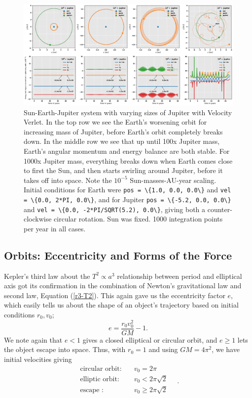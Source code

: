 \documentclass[]{article}
\begin{document}
\begin{figure}[!htb]
	\centering
	\includegraphics[width=1\linewidth]{massive-jupiter.png}
	\caption{Sun-Earth-Jupiter system with varying sizes of Jupiter with Velocity Verlet. In the top row we see the Earth's worsening orbit for increasing mass of Jupiter, before Earth's orbit completely breaks down. In the middle row we see that up until 100x Jupiter mass, Earth's angular momentum and energy balance are both stable. For 1000x Jupiter mass, everything breaks down when Earth comes close to first the Sun, and then starts swirling around Jupiter, before it takes off into space. Note the $10^{-5}$ Sun-masses-AU-year scaling. Initial conditions for Earth were \lstinline|pos = \{1.0, 0.0, 0.0\}| and \lstinline|vel = \{0.0, 2*PI, 0.0\}|, and for Jupiter \lstinline|pos = \{-5.2, 0.0, 0.0\}| and \lstinline|vel = \{0.0, -2*PI/SQRT(5.2), 0.0\}|, giving both a counter-clockwise circular rotation. Sun was fixed. 1000 integration points per year in all cases.}
	\label{fig:massive-jupiter}
\end{figure}

\subsection{Orbits: Eccentricity and Forms of the Force}
Kepler's third law about the $T^2 \propto a^3$ relationship between period and elliptical axis got its confirmation in the combination of Newton's gravitational law and second law, Equation (\ref{r3-T2}). This again gave us the eccentricity factor $e$, which easily tells us about the shape of an object's trajectory based on initial conditions $r_0, v_0$;
\begin{equation}
	e = \frac{r_0 v_0^2}{GM} - 1.
\end{equation}
We note again that $e<1$ gives a closed elliptical or circular orbit, and $e \ge 1$ lets the object escape into space. Thus, with $r_0 = 1$ and using $GM = 4 \pi^2$, we have initial velocities giving
\begin{equation} \label{v0}
\begin{aligned}
	\text{circular orbit:}& \quad v_0 = 2 \pi \\
	\text{elliptic orbit:}& \quad v_0 < 2 \pi \sqrt{2} \\
	\text{escape :}& \quad v_0 \ge 2 \pi \sqrt{2} \\
\end{aligned} \quad.
\end{equation}
\end{document}
